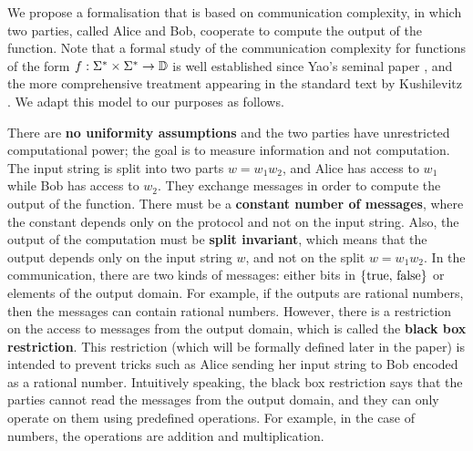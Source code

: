 We propose a formalisation that is based on communication complexity, in which
two parties, called Alice and Bob, cooperate to compute the output of the
function. Note that a formal study of the communication complexity for
functions of the form $f : \Sigma^* \times \Sigma^* \to \mathbb D$ is well
established since Yao's seminal paper \cite{YAO79}, and the more comprehensive
treatment appearing in the standard text by Kushilevitz \cite{KUSH97}. We adapt
this model to our purposes as follows.

There are \textbf{no uniformity assumptions} and the two parties
have unrestricted computational power; the goal is to measure information and
not computation.  The input string is split into two parts $w = w_1 w_2$, and
Alice has access to $w_1$ while Bob has access to $w_2$. They exchange messages
in order to compute the output of the  function. There must be a
\textbf{constant number of messages}, where the constant  depends only on the
protocol and not on the input string. Also, the  output of the computation must
be \textbf{split invariant}, which means that the output depends only on the
input string $w$, and not on the split $w = w_1 w_2$. In the communication,
there are two kinds of messages:  either bits in $\{\text{true, false}\}$  or
elements of the output domain. For example, if the outputs are rational
numbers, then the messages can contain rational numbers. However, there is a
restriction on the access to messages from the output domain, which is called
the \textbf{black box restriction}. This restriction (which will be formally
defined later in the paper) is intended to prevent tricks such as Alice sending
her input string to Bob encoded as a rational number. Intuitively speaking,
the  black box restriction says that the parties cannot read the messages from
the output domain, and they can only operate on them using predefined
operations. For example, in the case of numbers, the operations are addition
and multiplication.

